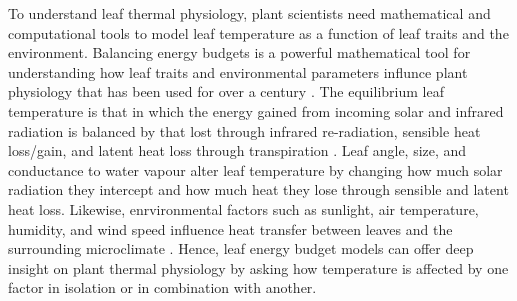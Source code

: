 \documentclass[11pt, oneside]{article}
\begin{document}
To understand leaf thermal physiology, plant scientists need mathematical and computational tools to model leaf temperature as a function of leaf traits and the environment. Balancing energy budgets is a powerful mathematical tool for understanding how leaf traits and environmental parameters influnce plant physiology that has been used for over a century \citep{Raschke_1960}. The equilibrium leaf temperature is that in which the energy gained from incoming solar and infrared radiation is balanced by that lost through infrared re-radiation, sensible heat loss/gain, and latent heat loss through transpiration \citep{Gutschick_2016}. Leaf angle, size, and conductance to water vapour alter leaf temperature by changing how much solar radiation they intercept and how much heat they lose through sensible and latent heat loss. Likewise, enrvironmental factors such as sunlight, air temperature, humidity, and wind speed influence heat transfer between leaves and the surrounding microclimate \citep{Gutschick_2016}. Hence, leaf energy budget models can offer deep insight on plant thermal physiology by asking how temperature is affected by one factor in isolation or in combination with another.
\end{document}
